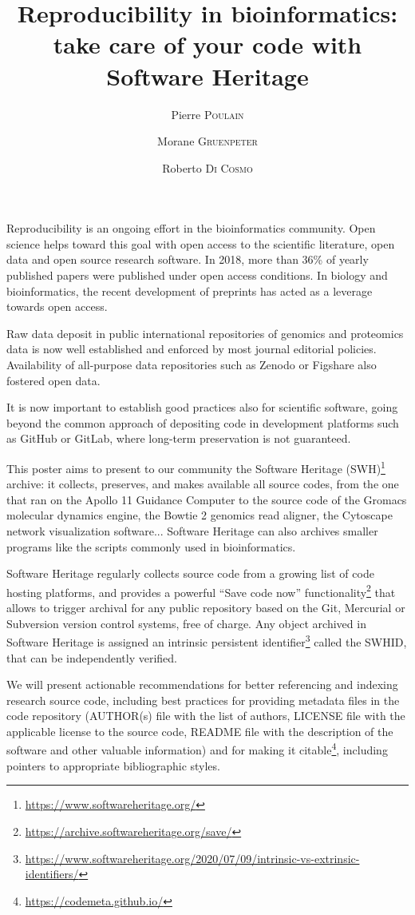 \documentclass[poster, final]{jobim}
\title{Reproducibility in bioinformatics: take care of your code with Software Heritage}
\author{Pierre \textsc{Poulain}\inst{1} \and Morane \textsc{Gruenpeter}\inst{2} \and Roberto \textsc{Di Cosmo}\inst{3}}
\institute{
	Université de Paris, CNRS, Institut Jacques Monod, F-75006, Paris, France
	\and
	Software Heritage, Inria, France
	\and
	Software Heritage, Inria and University of Paris, France
}
\begin{document}

\maketitle

\setcounter{footnote}{0}

Reproducibility is an ongoing effort in the bioinformatics community\cite{kim2018}. Open science helps toward this goal with open access to the scientific literature, open data and
open source research software. In 2018, more than 36\% of yearly published papers were published under open access conditions\cite{trendsopenaccesspublications}. In biology and bioinformatics, the recent development of preprints has acted as a leverage towards open access.

Raw data deposit in public international repositories of genomics and proteomics data is now well established and enforced by most journal editorial policies. Availability of all-purpose data repositories such as Zenodo or Figshare also fostered open data.

It is now important to establish good practices also for scientific software,
going beyond the common approach of depositing code in development platforms
such as GitHub or GitLab, where long-term preservation is not guaranteed.

This poster aims to present to our community the Software Heritage (SWH)\footnote{\url{https://www.softwareheritage.org/}} archive\cite{dicosmo2017}: it collects, preserves, and makes available all source codes, from the one that ran on the Apollo 11 Guidance Computer to the source code of the Gromacs molecular dynamics engine, the Bowtie 2 genomics read aligner, the Cytoscape network visualization software... Software Heritage can also archives smaller programs like the scripts commonly used in bioinformatics.

Software Heritage regularly collects source code from a growing list of code
hosting platforms, and provides a powerful “Save code now” functionality\footnote{\url{https://archive.softwareheritage.org/save/}} that allows to trigger archival for any
public repository based on the Git, Mercurial or Subversion version control systems, free of charge. Any object archived in Software Heritage is assigned an intrinsic persistent identifier\footnote{\url{https://www.softwareheritage.org/2020/07/09/intrinsic-vs-extrinsic-identifiers/}} called the SWHID\cite{dicosmo2020},
that can be independently verified.

We will present actionable recommendations for better referencing and indexing research source code, including best practices for providing metadata files in the code repository (AUTHOR(s) file with the list of authors, LICENSE file with the applicable license to the source code, README file with the description of the software and other valuable information) and for making it citable\footnote{\url{https://codemeta.github.io/}}, including pointers to appropriate bibliographic styles\cite{dicosmo2020}.


\printbibliography
 
\end{document}
